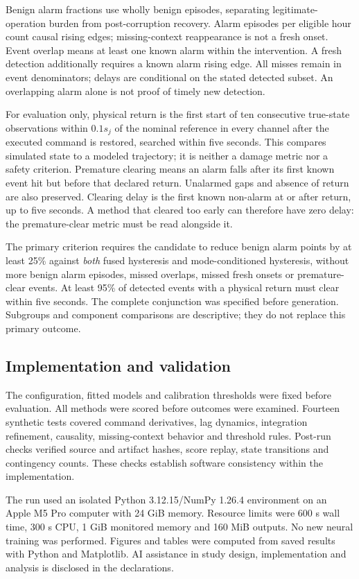Benign alarm fractions use wholly benign episodes, separating legitimate-operation burden from post-corruption recovery. Alarm episodes per eligible hour count causal rising edges; missing-context reappearance is not a fresh onset. Event overlap means at least one known alarm within the intervention. A fresh detection additionally requires a known alarm rising edge. All misses remain in event denominators; delays are conditional on the stated detected subset. An overlapping alarm alone is not proof of timely new detection.

For evaluation only, physical return is the first start of ten consecutive true-state observations within $0.1s_j$ of the nominal reference in every channel after the executed command is restored, searched within five seconds. This compares simulated state to a modeled trajectory; it is neither a damage metric nor a safety criterion. Premature clearing means an alarm falls after its first known event hit but before that declared return. Unalarmed gaps and absence of return are also preserved. Clearing delay is the first known non-alarm at or after return, up to five seconds. A method that cleared too early can therefore have zero delay: the premature-clear metric must be read alongside it.

The primary criterion requires the candidate to reduce benign alarm points by at least 25\% against \emph{both} fused hysteresis and mode-conditioned hysteresis, without more benign alarm episodes, missed overlaps, missed fresh onsets or premature-clear events. At least 95\% of detected events with a physical return must clear within five seconds. The complete conjunction was specified before generation. Subgroups and component comparisons are descriptive; they do not replace this primary outcome.

\subsection{Implementation and validation}
The configuration, fitted models and calibration thresholds were fixed before evaluation. All methods were scored before outcomes were examined. Fourteen synthetic tests covered command derivatives, lag dynamics, integration refinement, causality, missing-context behavior and threshold rules. Post-run checks verified source and artifact hashes, score replay, state transitions and contingency counts. These checks establish software consistency within the implementation.

The run used an isolated Python 3.12.15/NumPy 1.26.4 environment on an Apple M5 Pro computer with 24 GiB memory. Resource limits were 600 s wall time, 300 s CPU, 1 GiB monitored memory and 160 MiB outputs. No new neural training was performed. Figures and tables were computed from saved results with Python and Matplotlib. AI assistance in study design, implementation and analysis is disclosed in the declarations.

